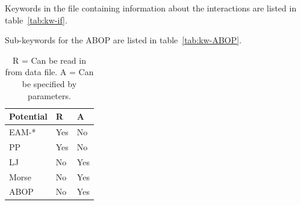 \documentclass[a4paper,12pt,onecolumn]{article}
\begin{document}
Keywords in the file containing information about the
interactions are listed in table~\ref{tab:kw-if}.

Sub-keywords for the ABOP are listed in table~\ref{tab:kw-ABOP}.


\begin{table}[!h]
\caption{
R = Can be read in from data file.
A = Can be specified by parameters.
\label{tab:pot-da}
}
\begin{center}
\begin{tabular}{|l|l|l|}
\hline
\hline
Potential   & R    & A  \\
\hline
EAM-*       & Yes  & No \\
PP          & Yes  & No \\
LJ          & No   & Yes \\
Morse       & No   & Yes \\
ABOP        & No   & Yes \\
\hline
\hline
\end{tabular}
\end{center}
\end{table}
\end{document}
